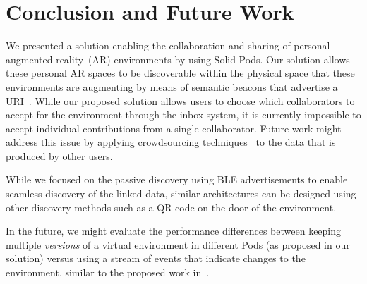 \section{Conclusion and Future Work}
We presented a solution enabling the collaboration and sharing of personal augmented reality~(AR) environments by using Solid Pods. Our solution allows these personal AR spaces to be discoverable within the physical space that these environments are augmenting by means of semantic beacons that advertise a URI~\cite{10.1145/3627050.3627060}. While our proposed solution allows users to choose which collaborators to accept for the environment through the inbox system, it is currently impossible to accept individual contributions from a single collaborator. Future work might address this issue by applying crowdsourcing techniques~\cite{10.1007/978-3-642-41338-4_17} to the data that is produced by other users.

While we focused on the passive discovery using BLE advertisements to enable seamless discovery of the linked data, similar architectures can be designed using other discovery methods such as a QR-code on the door of the environment. 

In the future, we might evaluate the performance differences between keeping multiple \textit{versions} of a virtual environment in different Pods (as proposed in our solution) versus using a stream of events that indicate changes to the environment, similar to the proposed work in~\cite{01H1940MY7FSFV0W0J44E3CCX7}.